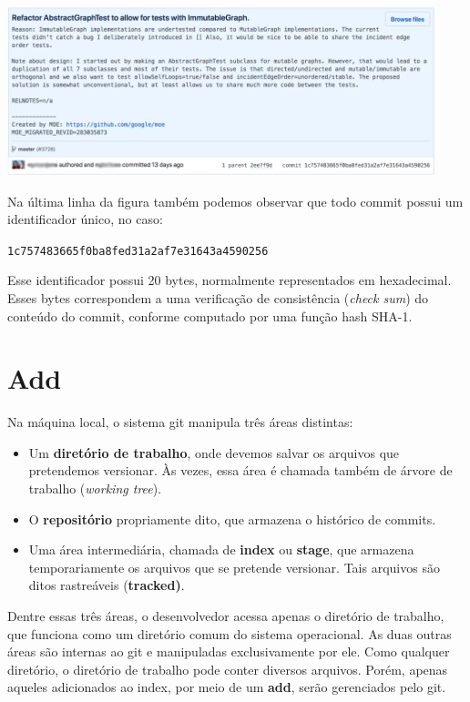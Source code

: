 \documentclass[
  11pt,
  twoside]{book}
\newcommand{\passthrough}[1]{#1}
\let\origfigure\figure
\let\endorigfigure\endfigure
\renewenvironment{figure}[1][2] {
    \expandafter\origfigure\expandafter[!h]
} {
    \endorigfigure
}
\begin{document}
\begin{figure}
\centering
\includegraphics[width=0.93\textwidth,height=\textheight]{figs/capAp/commit.png}
\caption{Commit no GitHub}
\end{figure}

Na última linha da figura também podemos observar que todo commit possui
um identificador único, no caso:

\passthrough{\lstinline!1c757483665f0ba8fed31a2af7e31643a4590256!}

Esse identificador possui 20 bytes, normalmente representados em
hexadecimal. Esses bytes correspondem a uma verificação de consistência
(\emph{check sum}) do conteúdo do commit, conforme computado por uma
função hash SHA-1.

\hypertarget{add}{%
\section{Add}\label{add}}


Na máquina local, o sistema git manipula três áreas distintas:

\begin{itemize}
\item
  Um \textbf{diretório de trabalho}, 
  onde devemos salvar os arquivos que pretendemos versionar. Às vezes,
  essa área é chamada também de árvore de trabalho (\emph{working
  tree}).
\item
  O \textbf{repositório} propriamente dito, que armazena o histórico de
  commits.
\item
  Uma área intermediária, chamada de \textbf{index} ou \textbf{stage},
  que  
   armazena temporariamente os arquivos
  que se pretende versionar. Tais arquivos são ditos rastreáveis
  (\textbf{tracked)}.
\end{itemize}

Dentre essas três áreas, o desenvolvedor acessa apenas o diretório de
trabalho, que funciona como um diretório comum do sistema operacional.
As duas outras áreas são internas ao git e manipuladas exclusivamente
por ele. Como qualquer diretório, o diretório de trabalho pode conter
diversos arquivos. Porém, apenas aqueles adicionados ao index, por meio
de um \textbf{add}, serão gerenciados pelo git.
\end{document}
